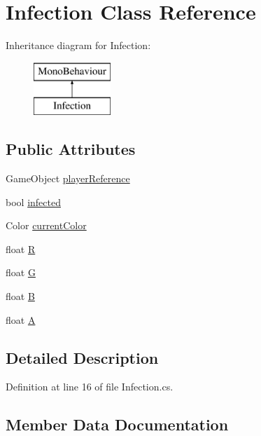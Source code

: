 \hypertarget{class_infection}{}\section{Infection Class Reference}
\label{class_infection}
Inheritance diagram for Infection\+:\begin{figure}[H]
\begin{center}
\leavevmode
\includegraphics[height=2.000000cm]{class_infection}
\end{center}
\end{figure}
\subsection*{Public Attributes}
\begin{DoxyCompactItemize}
\item 
Game\+Object \hyperlink{class_infection_aac370972b02543b0ad70b25840224f82}{player\+Reference}
\item 
bool \hyperlink{class_infection_ad4b2065e411b4aacb19f2f7ccd32cb47}{infected}
\item 
Color \hyperlink{class_infection_ad3af6c8327fa2602602441aef959bb8f}{current\+Color}
\item 
float \hyperlink{class_infection_ae45fa01c06fe42314a4846d713a436f4}{R}
\item 
float \hyperlink{class_infection_ab3534c9042ed3248a3179d6d3884bf9f}{G}
\item 
float \hyperlink{class_infection_a8fcb6741aa0001114773110539cd9a7a}{B}
\item 
float \hyperlink{class_infection_a7e45ecdc669fde1538935217b430df51}{A}
\end{DoxyCompactItemize}


\subsection{Detailed Description}


Definition at line 16 of file Infection.\+cs.



\subsection{Member Data Documentation}
\hypertarget{class_infection_a7e45ecdc669fde1538935217b430df51}{}\label{class_infection_a7e45ecdc669fde1538935217b430df51} 
